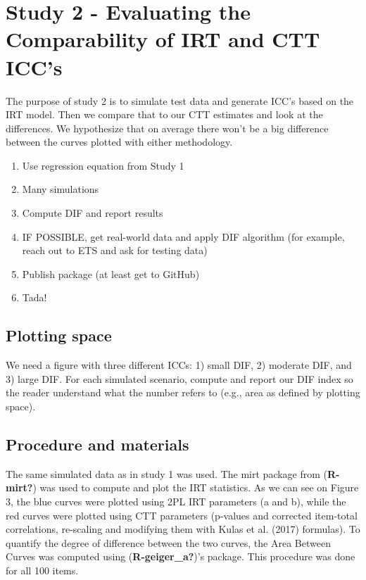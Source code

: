 \documentclass[
  man]{apa6}
\providecommand{\tightlist}{%
  \setlength{\itemsep}{0pt}\setlength{\parskip}{0pt}}
\begin{document}
\hypertarget{study-2---evaluating-the-comparability-of-irt-and-ctt-iccs}{%
\section{Study 2 - Evaluating the Comparability of IRT and CTT ICC's}\label{study-2---evaluating-the-comparability-of-irt-and-ctt-iccs}}

The purpose of study 2 is to simulate test data and generate ICC's based on the IRT model. Then we compare that to our CTT estimates and look at the differences. We hypothesize that on average there won't be a big difference between the curves plotted with either methodology.

\begin{enumerate}
\def\labelenumi{\arabic{enumi}.}
\tightlist
\item
  Use regression equation from Study 1
\item
  Many simulations
\item
  Compute DIF and report results
\item
  IF POSSIBLE, get real-world data and apply DIF algorithm (for example, reach out to ETS and ask for testing data)
\item
  Publish package (at least get to GitHub)
\item
  Tada!
\end{enumerate}

\hypertarget{plotting-space}{%
\subsection{Plotting space}\label{plotting-space}}

We need a figure with three different ICCs: 1) small DIF, 2) moderate DIF, and 3) large DIF. For each simulated scenario, compute and report our DIF index so the reader understand what the number refers to (e.g., area as defined by plotting space).

\hypertarget{procedure-and-materials}{%
\subsection{Procedure and materials}\label{procedure-and-materials}}

The same simulated data as in study 1 was used. The mirt package from (\textbf{R-mirt?}) was used to compute and plot the IRT statistics. As we can see on Figure 3, the blue curves were plotted using 2PL IRT parameters (a and b), while the red curves were plotted using CTT parameters (p-values and corrected item-total correlations, re-scaling and modifying them with Kulas et al. (2017) formulas). To quantify the degree of difference between the two curves, the Area Between Curves was computed using (\textbf{R-geiger\_a?})'s package. This procedure was done for all 100 items.
\end{document}
